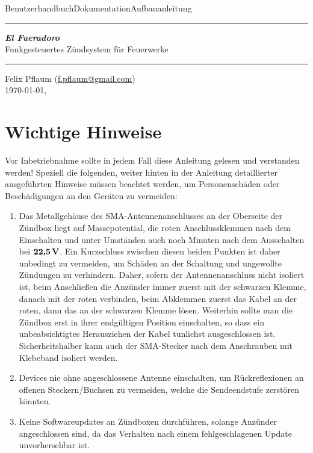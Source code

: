 \documentclass[pdftex, parskip, numbers=noenddot, toc=listof]{scrbook}
\newcommand{\anlage}{\emph{El Fueradoro}}
\begin{document}
	\begin{titlepage}
		\thispagestyle{empty}
		{\sffamily\LARGE Benutzerhandbuch{\hfill}Dokumentation{\hfill}Aufbauanleitung}\\ \hrule \vspace*{\fill}
		\begin{center}
			{\fontsize{90pt}{90pt} \sffamily\textbf{\anlage}} \\ \vspace{2em}
			{\LARGE \sffamily Funkgesteuertes Zündsystem für Feuerwerke}
		\end{center}
		\vspace*{\fill}
		\hrule
		\begin{center}
			\sffamily\Large Felix Pflaum (\href{mailto:f.pflaum@gmail.com}{f.pflaum@gmail.com})\\
			\normalsize \ddmmyyyydate\today, \currenttime
		\end{center}
	\end{titlepage}
	\chapter*{Wichtige Hinweise}

	Vor Inbetriebnahme sollte in jedem Fall diese Anleitung gelesen und verstanden werden! Speziell die folgenden, weiter hinten in der Anleitung detaillierter ausgeführten Hinweise müssen beachtet werden, um Personenschäden oder Beschädigungen an den Geräten zu vermeiden:

	{\bfseries
		\begin{enumerate}
			\item Das Metallgehäuse des SMA-Antennenanschlusses an der Oberseite der Zündbox liegt auf Massepotential, die roten Anschlussklemmen nach dem Einschalten und unter Umständen auch noch Minuten nach dem Ausschalten bei $\unit[\textbf{22{,}5}]{\textbf{V}}$. Ein Kurzschluss zwischen diesen beiden Punkten ist daher unbedingt zu vermeiden, um Schäden an der Schaltung und ungewollte Zündungen zu verhindern. Daher, sofern der Antennenanschluss nicht isoliert ist, beim Anschließen die Anzünder immer zuerst mit der schwarzen Klemme, danach mit der roten verbinden, beim Abklemmen zuerst das Kabel an der roten, dann das an der schwarzen Klemme lösen. Weiterhin sollte man die Zündbox erst in ihrer endgültigen Position einschalten, so dass ein unbeabsichtigtes Herausziehen der Kabel tunlichst ausgeschlossen ist. Sicherheitshalber kann auch der SMA-Stecker nach dem Anschrauben mit Klebeband isoliert werden.
			\item Devices nie ohne angeschlossene Antenne einschalten, um Rückreflexionen an offenen Steckern/Buchsen zu vermeiden, welche die Sendeendstufe zerstören könnten.
			\item Keine Softwareupdates an Zündboxen durchführen, solange Anzünder angeschlossen sind, da das Verhalten nach einem fehlgeschlagenen Update unvorhersehbar ist.
		\end{enumerate}
	}
\end{document}
